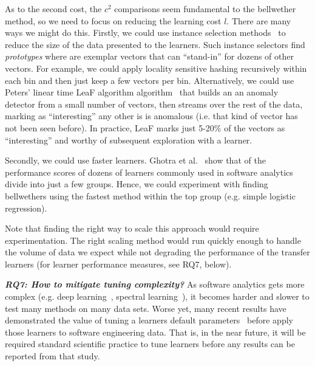  As to the second cost, the $c^2$ comparisons seem fundamental to the bellwether method, so we need to focus on reducing the learning cost $l$.
There are many ways we might do this.
Firstly, we could use instance selection methods~\cite{song2017efficient} to reduce the size of the data presented to the learners.
Such instance selectors find {\em prototypes} where are exemplar vectors that can ``stand-in'' for dozens of other 
vectors. For example, we could apply locality sensitive hashing recursively within each bin and  then just keep
a few vectors per bin. Alternatively, we could use Peters' linear time LeaF algorithm algorithm~\cite{peters2015lace2} 
that builds an an anomaly detector from a small number of vectors, then streams over the rest
of the data, marking as ``interesting'' any other is is anomalous (i.e. that kind of vector has not been seen before).
In practice, LeaF marks just  5-20\% of the vectors as ``interesting'' and worthy of subsequent exploration with a learner. 




Secondly, we could use faster learners. Ghotra et al.~\cite{Gh15} 
show that of the performance scores of  dozens of learners commonly used in software analytics divide into just a few groups.
Hence, we could experiment with finding bellwethers using
the fastest method within the top group (e.g. simple logistic regression).

Note that finding the right way to scale this approach would require experimentation. The right scaling method
would run quickly enough to handle the volume of data we expect  while
not degrading the performance of the transfer learners (for learner performance measures, see RQ7, below).


\textit{\textbf{ RQ7: How to mitigate tuning complexity?}} As software analytics gets more complex (e.g. deep learning~\cite{fu17}, spectral learning~\cite{Wang:2016,nair2017faster}), it becomes
harder and slower to test many methods on many data sets.
Worse yet, many recent results have demonstrated the value of tuning
a learners default parameters~\cite{agrawal17,agrawal2018wrong,Tantithamthavorn18,fu2016tuning} before apply those learners to software engineering data.
That is, in the near future, it will be required standard scientific
practice to tune learners before any results can be reported from that study.

